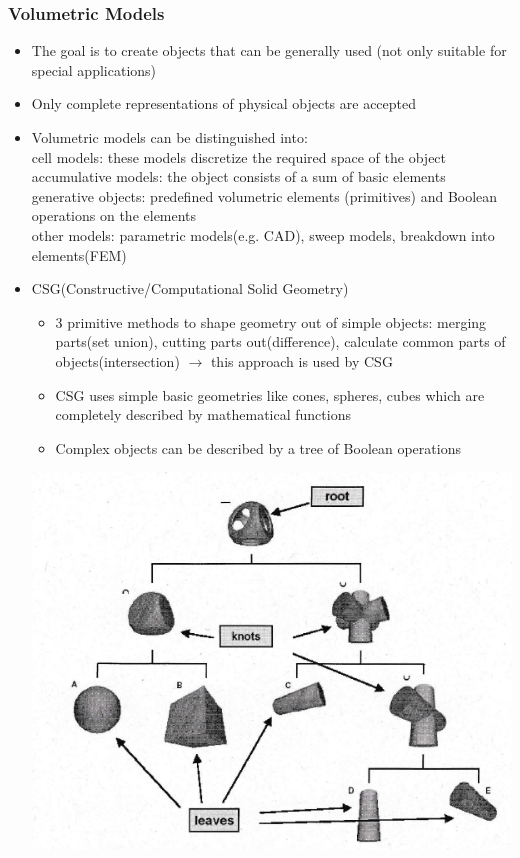 \documentclass[12pt]{article}
\begin{document}
\subsubsection*{Volumetric Models}

\begin{itemize}
	\item The goal is to create objects that can be generally used (not only suitable for special applications)
	\item Only complete representations of physical objects are accepted
	\item Volumetric models can be distinguished into: \\
	cell models: these models discretize the required space of the object \\
	accumulative models: the object consists of a sum of basic elements \\
	generative objects: predefined volumetric elements (primitives) and Boolean operations on the elements \\
	other models: parametric models(e.g. CAD), sweep models, breakdown into elements(FEM)
	\item CSG(Constructive/Computational Solid Geometry)
	\begin{itemize}
		\item 3 primitive methods to shape geometry out of simple objects: merging parts(set union), cutting parts out(difference), calculate common parts of objects(intersection) $\rightarrow$ this approach is used by CSG
		\item CSG uses simple basic geometries like cones, spheres, cubes which are completely described by mathematical functions
		\item Complex objects can be described by a tree of Boolean operations		
	\end{itemize}
	\includegraphics[scale=0.8]{3_62}

\end{itemize}
\end{document}
